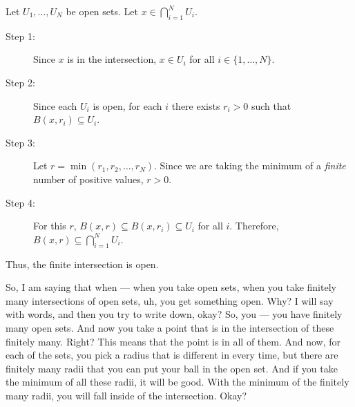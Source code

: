 \begin{math-stroke}
\begin{ai-proof-skeleton-invisible-content}
\end{ai-proof-skeleton-invisible-content}
Let $U_1, \dots, U_N$ be open sets. Let $x \in \bigcap_{i=1}^N U_i$.
\begin{description}
    \item[Step 1:] Since $x$ is in the intersection, $x \in U_i$ for all $i \in \{1, \dots, N\}$.
    \item[Step 2:] Since each $U_i$ is open, for each $i$ there exists $r_i > 0$ such that $B(x, r_i) \subseteq U_i$.
    \item[Step 3:] Let $r = \min(r_1, r_2, \dots, r_N)$. Since we are taking the minimum of a \emph{finite} number of positive values, $r > 0$.
    \item[Step 4:] For this $r$, $B(x, r) \subseteq B(x, r_i) \subseteq U_i$ for all $i$. Therefore, $B(x, r) \subseteq \bigcap_{i=1}^N U_i$.
\end{description}
Thus, the finite intersection is open.
\end{math-stroke}


\begin{spoken-clean}[00:18:05 - 00:19:05]
So, I am saying that when --- when you take open sets, when you take finitely many intersections of open sets, uh, you get something open. Why? I will say with words, and then you try to write down, okay? So, you --- you have finitely many open sets. And now you take a point that is in the intersection of these finitely many. Right? This means that the point is in all of them. And now, for each of the sets, you pick a radius that is different in every time, but there are finitely many radii that you can put your ball in the open set. And if you take the minimum of all these radii, it will be good. With the minimum of the finitely many radii, you will fall inside of the intersection. Okay?
\end{spoken-clean}

